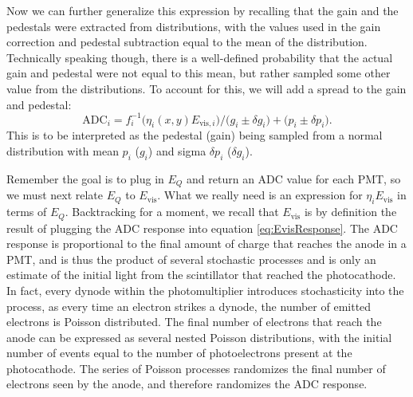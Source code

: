 Now we can further generalize this expression by recalling that the gain and the pedestals
were extracted from distributions, with the values used in the gain correction and pedestal
subtraction equal to the mean of the distribution. Technically speaking though, there is a
well-defined probability that the actual gain and pedestal were not equal to this mean, but rather
sampled some other value from the distributions. To account for this, we will add a spread
to the gain and pedestal:
%
\begin{equation} 
  \mathrm{ADC}_i = f_i^{-1}\big(\eta_i(x,y)  E_{\mathrm{vis},i} \big)/\big(g_i\pm\delta g_i\big) + \big(p_i \pm \delta p_i\big).
  \label{eq:pmtResponse}
\end{equation}
%
This is to be interpreted as the pedestal (gain) being sampled from a normal
distribution with mean $p_i$ ($g_i$) and sigma $\delta p_i$ ($\delta g_i$).

Remember the goal is to plug in $E_Q$ and return an ADC value for each PMT, so we must next
relate $E_Q$ to $E_{\mathrm{vis}}$. What we really need is an expression for $\eta_iE_{\mathrm{vis}}$ in terms of $E_Q$.
Backtracking for a moment, we recall that $E_{\mathrm{vis}}$ is by definition the result
of plugging the ADC response into equation \ref{eq:EvisResponse}. The ADC response is proportional to the final amount of charge
that reaches the anode in a PMT, and is thus the product
of several stochastic processes and is only an estimate of the initial light from the scintillator that reached
the photocathode. In fact, every dynode within the photomultiplier introduces stochasticity into the process, as every time an electron
strikes a dynode, the number of emitted electrons is Poisson distributed. The final number of electrons that reach the anode
can be expressed as several nested Poisson distributions,
with the initial number of events equal to the number of photoelectrons present at the photocathode. The series of Poisson
processes randomizes the final number of electrons seen by the anode, and therefore randomizes the ADC response.

